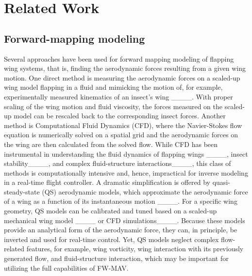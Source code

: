 \section{Related Work}
\subsection{Forward-mapping modeling}
 
 Several approaches have been used for forward mapping modeling of flapping wing systems, that is, finding the aerodynamic forces resulting from a given wing motion. One direct method is measuring the aerodynamic forces on a scaled-up wing model flapping in a fluid and mimicking the motion of, for example, experimentally measured kinematics of an insect's wing ____. With proper scaling of the wing motion and fluid viscosity, the forces measured on the scaled-up model can be rescaled back to the corresponding insect forces.  
 Another method is Computational Fluid Dynamics (CFD), where the Navier-Stokes flow equation is numerically solved on a spatial grid and the aerodynamic forces on the wing are then calculated from the solved flow. While CFD has been instrumental in understanding the fluid dynamics of flapping wings ____, insect stability____, and complex fluid-structure interactions____, this class of methods is computationally intensive and, hence, impractical for inverse modeling in a real-time flight controller. 
 A dramatic simplification is offered by quasi-steady-state (QS) aerodynamic models, which approximate the aerodynamic force of a wing as a function of its instantaneous motion ____. For a specific wing geometry, QS models can be calibrated and tuned based on a scaled-up mechanical wing model  ____ or CFD simulations____. Because these models provide an analytical form of the aerodynamic force, they can, in principle, be inverted and used for real-time control. Yet, QS models neglect complex flow-related features, for example, wing vorticity, wing interaction with its previously generated flow, and fluid-structure interaction, which may be important for utilizing the full capabilities of FW-MAV.  

